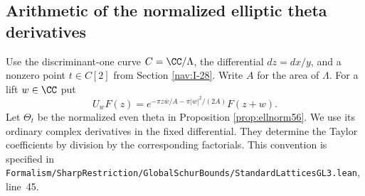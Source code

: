 \documentclass[a4paper,11pt]{article}
\theoremstyle{definition}
\theoremstyle{remark}
\newcommand{\srcloc}[2]{{\small\nolinkurl{#1.lean}}, line~#2}
\numberwithin{equation}{section}
\begin{document}
\subsection{Arithmetic of the normalized elliptic theta derivatives}\label{nav:V-11}
\label{sec:ell57}

Use the discriminant-one curve \(C=\CC/\Lambda\), the differential
\(dz=dx/y\), and a nonzero point \(t\in C[2]\) from
Section \ref{nav:I-28}.
Write \(A\) for the area of \(\Lambda\). For a lift \(w\in\CC\) put
\[
    U_wF(z)=e^{-\pi z\bar w/A-\pi|w|^2/(2A)}F(z+w).
\]
Let \(\Theta_t\) be the normalized even theta in
Proposition \ref{prop:ellnorm56}. We use its ordinary complex derivatives
in the fixed differential. They determine the Taylor coefficients
by division by the corresponding factorials. This convention is
specified in
\srcloc{Formalism/SharpRestriction/GlobalSchurBounds/StandardLatticesGL3}{45}.
\end{document}
